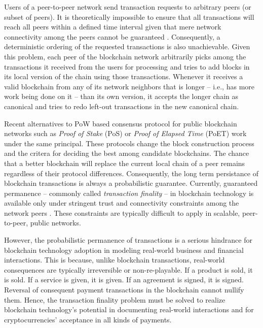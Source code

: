 Users of a peer-to-peer network send transaction requests to arbitrary peers (or subset of peers). It is theoretically impossible to ensure that all transactions will reach all peers within a defined time interval given that mere network connectivity among the peers cannot be guaranteed \cite{Fischer1983TheCP}. Consequently, a deterministic ordering of the requested transactions is also unachievable. Given this problem, each peer of the blockchain network arbitrarily picks among the transactions it received from the users for processing  and tries to add blocks in its local version of the chain using those transactions. Whenever it receives a valid blockchain from any of its network neighbors that is longer -- i.e., has more work being done on it -- than its own version, it accepts the longer chain as canonical and tries to redo left-out transactions in the new canonical chain. 

Recent alternatives to PoW based consensus protocol for public blockchain networks such as \textit{Proof of Stake} (PoS) \cite{casper} or \textit{Proof of Elapsed Time} (PoET) \cite{poet} work under the same principal. These protocols change the block construction process and the critera for deciding the best among candidate blockchains. The chance that a better blockchain will replace the current local chain of a peer remains regardless of their protocol differences. Consequently, the long term persistance of blockchain transactions is always a probabilistic guarantee. Currently, guaranteed permanence -- commonly called \textit{transaction finality} -- in blockchain technology is available only under stringent trust and connectivity constraints among the network peers \cite{David2014TheRP, thestellar}. These constraints are typically difficult to apply in scalable, peer-to-peer, public networks.   

However, the probabilistic permanence of transactions is a serious hindrance for blockchain technology adoption in modeling real-world business and financial interactions. This is because, unlike blockchain transactions, real-world consequences are typically irreversible or non-re-playable. If a product is sold, it is sold. If a service is given, it is given. If an agreement is signed, it is signed. Reversal of consequent payment transactions in the blockchain cannot nullify them. Hence, the transaction finality problem must be solved to realize blockchain technology's potential in documenting real-world interactions and for cryptocurrencies' acceptance in all kinds of payments.

